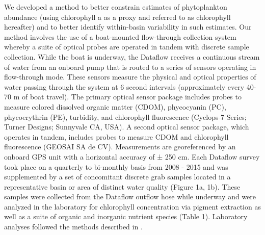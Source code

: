 \documentclass[review]{elsarticle}
\begin{document}
We developed a method to better constrain estimates of phytoplankton abundance (using chlorophyll a as a proxy and referred to as chlorophyll hereafter) and to better identify within-basin variability in such estimates. Our method involves the use of a boat-mounted flow-through collection system \citep[Dataflow;][]{madden1992instrument} whereby a suite of optical probes are operated in tandem with discrete sample collection. While the boat is underway, the Dataflow receives a continuous stream of water from an onboard pump that is routed to a series of sensors operating in flow-through mode. These sensors measure the physical and optical properties of water passing through the system at 6 second intervals (approximately every 40-70 m of boat travel). The primary optical sensor package includes probes to measure  colored dissolved organic matter (CDOM), phycocyanin (PC), phycoerythrin (PE), turbidity, and chlorophyll fluorescence (Cyclops-7 Series; Turner Designs; Sunnyvale CA, USA). A second optical sensor package, which operates in tandem, includes probes to measure CDOM and chlorophyll fluorescence (GEOSAI SA de CV). Measurements are georeferenced by an onboard GPS unit with a horizontal accuracy of ± 250 cm. Each Dataflow survey took place on a quarterly to bi-monthly basis from 2008 - 2015 and was supplemented by a set of concomitant discrete grab samples located in a representative basin or area of distinct water quality (Figure 1a, 1b). These samples were collected from the Dataflow outflow hose while underway and were analyzed in the laboratory for chlorophyll concentration via pigment extraction as well as a suite of organic and inorganic nutrient species (Table 1). Laboratory analyses followed the methods described in \citet{childers_relating_2006}.
\end{document}
